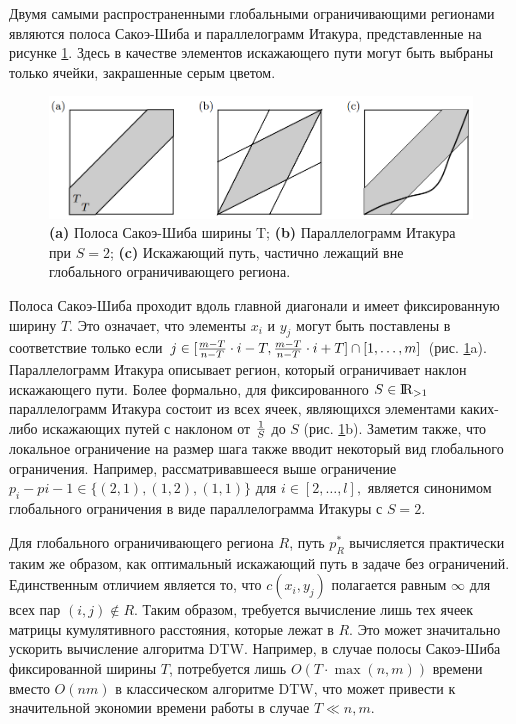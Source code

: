 \documentclass[a4paper, 14pt]{extarticle}
\numberwithin{figure}{subsection}
\numberwithin{equation}{subsection}
\begin{document}
Двумя самыми распространенными глобальными ограничивающими регионами являются полоса Сакоэ-Шиба и параллелограмм Итакура, представленные на рисунке \ref{fig:p7}. Здесь в качестве элементов искажающего пути могут быть выбраны только ячейки, закрашенные серым цветом.

\begin{figure}[h]
\centering
\includegraphics[width=15cm]{p7.png}
\caption{{\bf (a)} Полоса Сакоэ-Шиба ширины T; {\bf (b)} Параллелограмм Итакура при $S=2$; {\bf (c)} Искажающий путь, частично лежащий вне глобального ограничивающего региона.}
\label{fig:p7}
\end{figure}

Полоса Сакоэ-Шиба проходит вдоль главной диагонали и имеет фиксированную ширину $T$. Это означает, что элементы $x_i$ и $y_j$ могут быть поставлены в соответствие только если $j \in [{{m-T}\over{n-T}} \cdot i - T,{{m-T}\over{n-T} }\cdot i + T] \cap [1,\dots,m]$ (рис. \ref{fig:p7}a). Параллелограмм Итакура описывает регион, который ограничивает наклон искажающего пути. Более формально, для фиксированного $S \in {\rm I\!R}_{>1}$ параллелограмм Итакура состоит из всех ячеек, являющихся элементами каких-либо искажающих путей с наклоном от $1 \over S$ до $S$ (рис. \ref{fig:p7}b). Заметим также, что локальное ограничение на размер шага также вводит некоторый вид глобального ограничения. Например, рассматривавшееся выше ограничение $p_i-p{i-1} \in \{(2,1),(1,2),(1,1)\}$ для $i \in [2,\dots,l],$ является синонимом глобального ограничения в виде параллелограмма Итакуры с $S=2.$

Для глобального ограничивающего региона $R$, путь $p_R^*$ вычисляется практически таким же образом, как оптимальный искажающий путь в задаче без ограничений. Единственным отличием является то, что $c(x_i,y_j)$ полагается равным $\infty$ для всех пар $(i,j) \notin R$. Таким образом, требуется вычисление лишь тех ячеек матрицы кумулятивного расстояния, которые лежат в $R$. Это может значитально ускорить вычисление алгоритма DTW. Например, в случае полосы Сакоэ-Шиба фиксированной ширины $T$, потребуется лишь $O(T \cdot \max(n,m))$ времени вместо $O(nm)$ в классическом алгоритме DTW, что может привести к значительной экономии времени работы в случае $T \ll n,m.$
\end{document}
